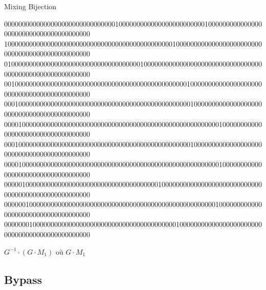 \documentclass{beamer}
\begin{document}
\begin{frame}{Mixing Bijection}

  \begin{center}

    {\tiny
      000000000000000000000000000000010000000000000000000000001000000000000000000000000000000000000000
      100000000000000000000000000000000000000000000001000000000000000000000000000000000000000000000000
      010000000000000000000000000000000000001000000000000000000000000000000000000000000000000000000000
      001000000000000000000000000000000000000000000000000100000000000000000000000000000000000000000000
      000100000000000000000000000000000000000000000000000010000000000000000000000000000000000000000000
      000010000000000000000000000000000000000000000000000000000000100000000000000000000000000000000000
      000100000000000000000000000000000000000000000000000010000000000000000000000000000000000000000000
      000010000000000000000000000000000000000000000000000000000000100000000000000000000000000000000000
      000001000000000000000000000000000000000000010000000000000000000000000000000000000000000000000000
      000000100000000000000000000000000000000000000000000000000001000000000000000000000000000000000000
      000000010000000000000000000000000000000000000000100000000000000000000000000000000000000000000000
    }

    $G^{-1} \cdot (G \cdot M_1)$ où $G \cdot M_1$
  \end{center}

\end{frame}

\subsection{Bypass}
\end{document}
